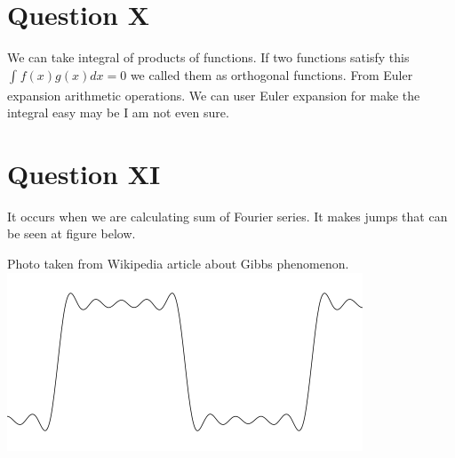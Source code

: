 \documentclass[a4paper, 12pt, titlepage]{article}
\begin{document}
\section{Question X}
We can take integral of products of functions.
If two functions satisfy this  $\int_{}{}{f(x)g(x)dx} = 0$  we called them as orthogonal functions. 
From Euler expansion arithmetic operations.
We can user Euler expansion for make the integral easy may be I am not even sure.
\section{Question XI}
It occurs when we are calculating sum of Fourier series. It makes jumps that can be seen at figure below.
 
Photo taken from Wikipedia article about  Gibbs phenomenon.\\
\includegraphics{gibs.png}
\end{document}
